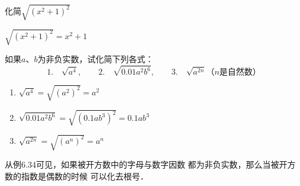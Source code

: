\begin{example}
    化简$\sqrt{(x^2+1)^2}$
\end{example}

\begin{solution}
    $\sqrt{(x^2+1)^2}=x^2+1$
\end{solution}

\begin{example}
    如果$a$、$b$为非负实数，试化简下列各式：
\[1.\quad\sqrt{a^4},\qquad 2.\quad\sqrt{0.01a^2b^6},\qquad 3.\quad\sqrt{a^{2n}}\text{（}n\text{是自然数）} \]
\end{example}

\begin{solution}
\begin{enumerate}
    \item $\sqrt{a^4}=\sqrt{(a^2)^2}=a^2$
    \item $\sqrt{0.01a^2b^6}=\sqrt{(0.1ab^3)^2}=0.1ab^3$
    \item $\sqrt{a^{2n}}=\sqrt{(a^n)^2}=a^n$
\end{enumerate}
\end{solution}

从例6.34可见，如果被开方数中的字母与数字因数
都为非负实数，那么当被开方数的指数是偶数的时候
可以化去根号．

